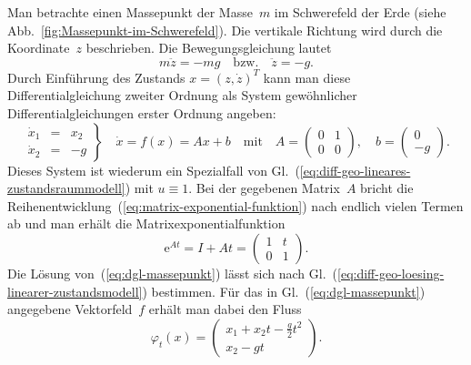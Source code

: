 \begin{example}
Man betrachte einen Massepunkt der Masse~$m$ im Schwerefeld der
Erde (siehe Abb.~\ref{fig:Massepunkt-im-Schwerefeld}). Die vertikale
Richtung wird durch die Koordinate~$z$ beschrieben. Die Bewegungsgleichung
lautet
\[
m\ddot{z}=-mg\quad\text{bzw.}\quad\ddot{z}=-g.
\]
Durch Einführung des Zustands $x=(z,\dot{z})^{T}$ kann man diese
Differentialgleichung zweiter Ordnung als System gewöhnlicher Differentialgleichungen
erster Ordnung angeben:
\begin{equation}
\left.\begin{array}{lcc}
\dot{x}_{1} & = & x_{2}\\
\dot{x}_{2} & = & -g
\end{array}\right\} \quad\dot{x}=f(x)=Ax+b\quad\text{mit}\quad A=\left(\begin{array}{cc}
0 & 1\\
0 & 0
\end{array}\right),\quad b=\left(\begin{array}{r}
0\\
-g
\end{array}\right).\label{eq:dgl-massepunkt}
\end{equation}
Dieses System ist wiederum ein Spezialfall von Gl.~(\ref{eq:diff-geo-lineares-zustandsraummodell})
mit $u\equiv1$. Bei der gegebenen Matrix~$A$ bricht die Reihenentwicklung~(\ref{eq:matrix-exponential-funktion})
nach endlich vielen Termen ab und man erhält die Matrixexponentialfunktion
\[
{\mathrm{e}}^{At}=I+At=\left(\begin{array}{cc}
1 & t\\
0 & 1
\end{array}\right).
\]
Die Lösung von~(\ref{eq:dgl-massepunkt}) lässt sich nach Gl.~(\ref{eq:diff-geo-loesing-linearer-zustandsmodell})
bestimmen. Für das in Gl.~(\ref{eq:dgl-massepunkt}) angegebene Vektorfeld~$f$
erhält man dabei den Fluss
\[
\varphi_{t}(x)=\left(\begin{array}{c}
x_{1}+x_{2}t-\frac{g}{2}t^{2}\\
x_{2}-gt
\end{array}\right).
\]
\end{example}


